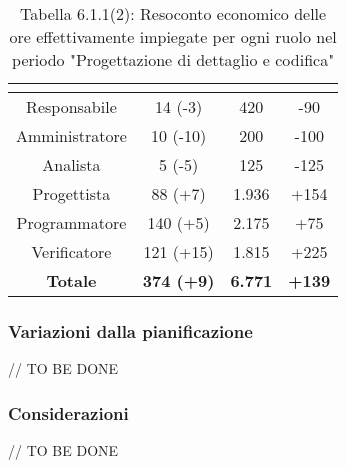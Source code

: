 \renewcommand{\arraystretch}{1.4}
\begin{table}[H]
\begin{center}
\begin{tabular}{|c|c|c|c|}
\hline
\rowcolor{title_row}
\textbf{\color{title_text}{Ruolo}}  & \textbf{\color{title_text}{Ore}} & \textbf{\color{title_text}{Costo in \euro}} & \textbf{\color{title_text}{Differenza al preventivo in \euro}} \\ \hline
Responsabile    & 14 (-3) & 420 & -90\\  \hline
Amministratore  & 10 (-10)& 200 & -100 \\ \hline
Analista        & 5 (-5) & 125 & -125 \\ \hline
Progettista     & 88 (+7) & 1.936 & +154\\ \hline
Programmatore   & 140 (+5) & 2.175 & +75\\ \hline
Verificatore    & 121 (+15) & 1.815& +225\\ \hline
\textbf{Totale} & \textbf{374 (+9)}    & \textbf{6.771} & \textbf{+139} \\ \hline
\end{tabular}
\caption{Tabella 6.1.1(2): Resoconto economico delle ore effettivamente impiegate per ogni ruolo nel periodo "Progettazione di dettaglio e codifica"\label{}}
\end{center}
\end{table}
\renewcommand{\arraystretch}{1}


\subsubsection{Variazioni dalla pianificazione}
// TO BE DONE

\subsubsection{Considerazioni}
// TO BE DONE
\pagebreak
